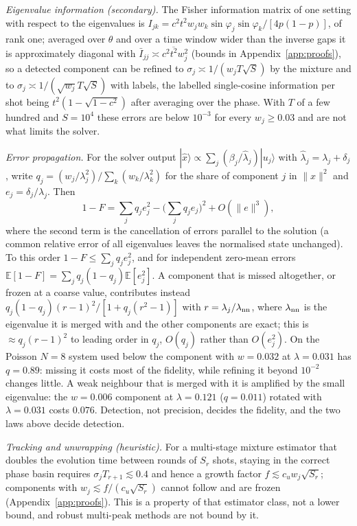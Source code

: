 \documentclass[journal]{IEEEtran}
\begin{document}
\emph{Eigenvalue information (secondary).} The Fisher information matrix of one setting with respect to the eigenvalues is $I_{jk}=c^2t^2w_jw_k\sin\varphi_j\sin\varphi_k/[4p(1-p)]$, of rank one; averaged over $\theta$ and over a time window wider than the inverse gaps it is approximately diagonal with $\bar I_{jj}\asymp c^2\overline{t^2}w_j^2$ (bounds in Appendix~\ref{app:proofs}), so a detected component can be refined to $\sigma_j\asymp1/(w_jT\sqrt S)$ by the mixture and to $\sigma_j\asymp1/(\sqrt{w_j}T\sqrt S)$ with labels, the labelled single-cosine information per shot being $t^2(1-\sqrt{1-c^2})$ after averaging over the phase. With $T$ of a few hundred and $S=10^4$ these errors are below $10^{-3}$ for every $w_j\ge0.03$ and are not what limits the solver.

\emph{Error propagation.} For the solver output $|\hat x\rangle\propto\sum_j(\beta_j/\hat\lambda_j)|u_j\rangle$ with $\hat\lambda_j=\lambda_j+\delta_j$, write $q_j=(w_j/\lambda_j^2)/\sum_k(w_k/\lambda_k^2)$ for the share of component $j$ in $\|x\|^2$ and $e_j=\delta_j/\lambda_j$. Then
\begin{equation}
1-F=\sum_jq_je_j^2-\Big(\sum_jq_je_j\Big)^2+O(\|e\|^3),
\label{eq:prop}
\end{equation}
where the second term is the cancellation of errors parallel to the solution (a common relative error of all eigenvalues leaves the normalised state unchanged). To this order $1-F\le\sum_jq_je_j^2$, and for independent zero-mean errors $\mathbb E[1-F]=\sum_jq_j(1-q_j)\mathbb E[e_j^2]$. A component that is missed altogether, or frozen at a coarse value, contributes instead $q_j(1-q_j)(r-1)^2/[1+q_j(r^2-1)]$ with $r=\lambda_j/\lambda_{\rm nn}$, where $\lambda_{\rm nn}$ is the eigenvalue it is merged with and the other components are exact; this is $\approx q_j(r-1)^2$ to leading order in $q_j$, $O(q_j)$ rather than $O(e_j^2)$. On the Poisson $N=8$ system used below the component with $w=0.032$ at $\lambda=0.031$ has $q=0.89$: missing it costs most of the fidelity, while refining it beyond $10^{-2}$ changes little. A weak neighbour that is merged with it is amplified by the small eigenvalue: the $w=0.006$ component at $\lambda=0.121$ ($q=0.011$) rotated with $\lambda=0.031$ costs $0.076$. Detection, not precision, decides the fidelity, and the two laws above decide detection.

\emph{Tracking and unwrapping (heuristic).} For a multi-stage mixture estimator that doubles the evolution time between rounds of $S_r$ shots, staying in the correct phase basin requires $\sigma_jT_{r+1}\lesssim0.4$ and hence a growth factor $f\lesssim c_uw_j\sqrt{S_r}$; components with $w_j\lesssim f/(c_u\sqrt{S_r})$ cannot follow and are frozen (Appendix~\ref{app:proofs}). This is a property of that estimator class, not a lower bound, and robust multi-peak methods \cite{RMPE2023,QMEGS2024} are not bound by it.
\end{document}
